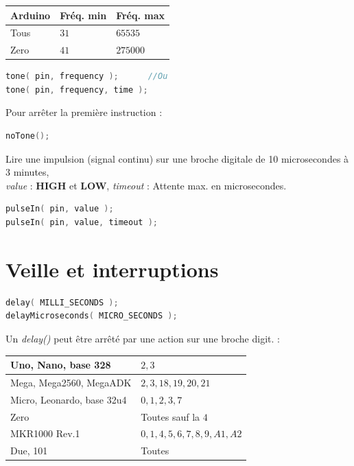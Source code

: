             \begin{center}
                 \begin{tabular}{| l | l | l |}
                    \hline
                        Arduino & Fréq. min & Fréq. max \\
                    \hline
                        Tous & $31$ & $65535$ \\
                        Zero & $41$ & $275000$ \\
                    \hline
                \end{tabular}
            \end{center}
            \begin{lstlisting}[language=C]
tone( pin, frequency );      //Ou
tone( pin, frequency, time );
            \end{lstlisting}

            \bmar
                Pour arrêter la première instruction :
            \emar
            \begin{lstlisting}[language=C]
noTone();
            \end{lstlisting}


            \bmar
                Lire une impulsion (signal continu) sur une broche digitale de 10 microsecondes à 3 minutes,\\
                \textit{value} : \textbf{HIGH} et \textbf{LOW}, \textit{timeout} : Attente max. en microsecondes.
            \emar
            \begin{lstlisting}[language=C]
pulseIn( pin, value );
pulseIn( pin, value, timeout );
            \end{lstlisting}

    \section{Veille et interruptions}
        \begin{lstlisting}[language=C]
delay( MILLI_SECONDS );
delayMicroseconds( MICRO_SECONDS );
        \end{lstlisting}
        \bmar
            Un \textit{delay()} peut être arrêté par une action sur une broche digit. :
        \emar

        \begin{center}
            \begin{tabular}{| l | l |}
                \hline
                    Uno, Nano, base 328 & $2, 3$\\
                \hline
                    Mega, Mega2560, MegaADK & $2, 3, 18, 19, 20, 21$\\
                \hline
                    Micro, Leonardo, base 32u4 & $0, 1, 2, 3, 7$\\
                \hline
                    Zero & Toutes sauf la $4$\\
                \hline
                    MKR1000 Rev.1 & $0, 1, 4, 5, 6, 7, 8, 9, A1, A2$\\
                \hline
                    Due, 101 & Toutes\\
                \hline
            \end{tabular}
        \end{center}

